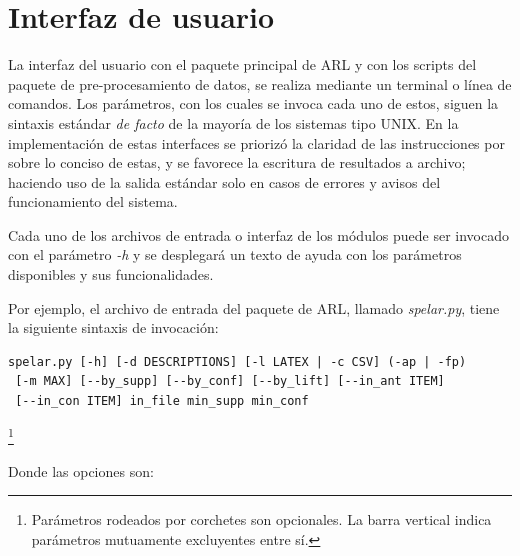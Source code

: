 \section{Interfaz de usuario}

La interfaz del usuario con el paquete principal de ARL y con los scripts del paquete de pre-procesamiento de datos, se realiza mediante un terminal o línea de comandos. Los parámetros, con los cuales se invoca cada uno de estos, siguen la sintaxis estándar \textit{de facto} de la mayoría de los sistemas tipo UNIX. En la implementación de estas interfaces se priorizó la claridad de las instrucciones por sobre lo conciso de estas, y se favorece la escritura de resultados a archivo; haciendo uso de la salida estándar solo en casos de errores y avisos del funcionamiento del sistema.

Cada uno de los archivos de entrada o interfaz de los módulos puede ser invocado con el parámetro \textit{-h} y se desplegará un texto de ayuda con los parámetros disponibles y sus funcionalidades.

Por ejemplo, el archivo de entrada del paquete de ARL, llamado \textit{spelar.py}, tiene la siguiente sintaxis de invocación:

\begin{lstlisting}[basicstyle=\ttfamily]
spelar.py [-h] [-d DESCRIPTIONS] [-l LATEX | -c CSV] (-ap | -fp)
 [-m MAX] [--by_supp] [--by_conf] [--by_lift] [--in_ant ITEM] 
 [--in_con ITEM] in_file min_supp min_conf
\end{lstlisting}\footnote{Parámetros rodeados por corchetes son opcionales. La barra vertical indica parámetros mutuamente excluyentes entre sí.}

Donde las opciones son:

